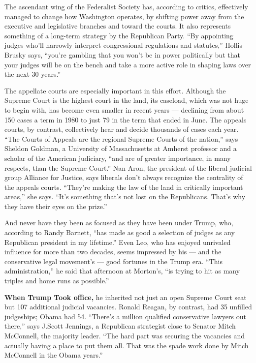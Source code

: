 The ascendant wing of the Federalist Society has, according to critics,
effectively managed to change how Washington operates, by shifting power
away from the executive and legislative branches and toward the courts.
It also represents something of a long-term strategy by the Republican
Party. ``By appointing judges who'll narrowly interpret congressional
regulations and statutes,'' Hollis-Brusky says, ``you're gambling that
you won't be in power politically but that your judges will be on the
bench and take a more active role in shaping laws over the next 30
years.''

The appellate courts are especially important in this effort. Although
the Supreme Court is the highest court in the land, its caseload, which
was not huge to begin with, has become even smaller in recent years ---
declining from about 150 cases a term in 1980 to just 79 in the term
that ended in June. The appeals courts, by contrast, collectively hear
and decide thousands of cases each year. ``The Courts of Appeals are the
regional Supreme Courts of the nation,'' says Sheldon Goldman, a
University of Massachusetts at Amherst professor and a scholar of the
American judiciary, ``and are of greater importance, in many respects,
than the Supreme Court.'' Nan Aron, the president of the liberal
judicial group Alliance for Justice, says liberals don't always
recognize the centrality of the appeals courts. ``They're making the law
of the land in critically important areas,'' she says. ``It's something
that's not lost on the Republicans. That's why they have their eyes on
the prize.''

And never have they been as focused as they have been under Trump, who,
according to Randy Barnett, ``has made as good a selection of judges as
any Republican president in my lifetime.'' Even Leo, who has enjoyed
unrivaled influence for more than two decades, seems impressed by his
--- and the conservative legal movement's --- good fortunes in the Trump
era. ``This administration,'' he said that afternoon at Morton's, ``is
trying to hit as many triples and home runs as possible.''

\textbf{When Trump Took office,} he inherited not just an open Supreme
Court seat but 107 additional judicial vacancies. Ronald Reagan, by
contrast, had 35 unfilled judgeships; Obama had 54. ``There's a million
qualified conservative lawyers out there,'' says J.Scott Jennings, a
Republican strategist close to Senator Mitch McConnell, the majority
leader. ``The hard part was securing the vacancies and actually having a
place to put them all. That was the spade work done by Mitch McConnell
in the Obama years.''

